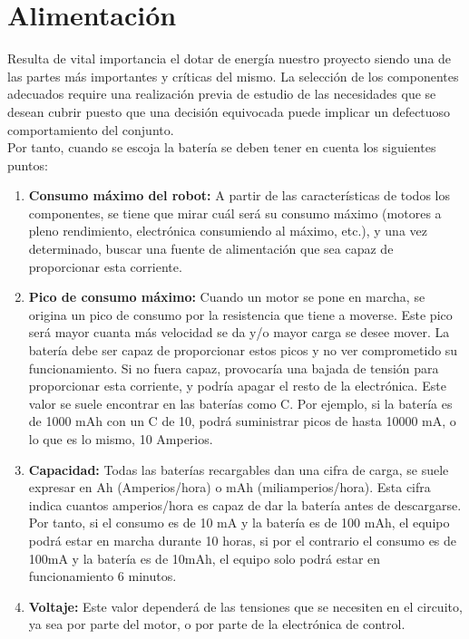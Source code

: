 \section{Alimentación}
\label{sub:alimentación}

Resulta de vital importancia el dotar de energía nuestro proyecto siendo una de las partes más importantes y críticas del mismo. La selección de los componentes adecuados
require una realización previa de estudio de las necesidades que se desean cubrir puesto que una decisión equivocada puede implicar un defectuoso
comportamiento del conjunto.\\

Por tanto, cuando se escoja la batería se deben tener en cuenta los siguientes puntos:\\

\begin{enumerate}

 \item \textbf{Consumo máximo del robot:} A partir de las características de todos los
componentes, se tiene que mirar cuál será su consumo máximo (motores a pleno
rendimiento, electrónica consumiendo al máximo, etc.), y una vez determinado,
buscar una fuente de alimentación que sea capaz de proporcionar esta corriente.

\item \textbf{Pico de consumo máximo:} Cuando un motor se pone en marcha, se origina un
pico de consumo por la resistencia que tiene a moverse. Este pico será mayor
cuanta más velocidad se da y/o mayor carga se desee mover. La batería debe ser
capaz de proporcionar estos picos y no ver comprometido su funcionamiento. Si no
fuera capaz, provocaría una bajada de tensión para proporcionar esta corriente, y
podría apagar el resto de la electrónica. Este valor se suele encontrar en las
baterías como C. Por ejemplo, si la batería es de 1000 mAh con un C de 10, podrá
suministrar picos de hasta 10000 mA, o lo que es lo mismo, 10 Amperios.


\item \textbf{Capacidad:} Todas las baterías recargables dan una cifra de carga, se suele
expresar en Ah (Amperios/hora) o mAh (miliamperios/hora). Esta cifra indica
cuantos amperios/hora es capaz de dar la batería antes de descargarse. Por tanto,
si el consumo es de 10 mA y la batería es de 100 mAh, el equipo podrá estar en
marcha durante 10 horas, si por el contrario el consumo es de 100mA y la batería
es de 10mAh, el equipo solo podrá estar en funcionamiento 6 minutos.

\item \textbf{Voltaje:} Este valor dependerá de las tensiones que se necesiten en el circuito, ya
sea por parte del motor, o por parte de la electrónica de control.

\end{enumerate}

